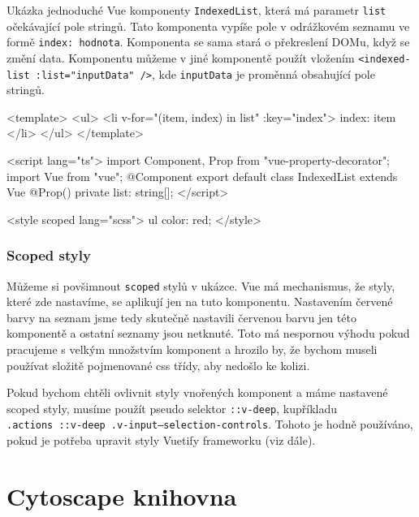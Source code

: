 \newpage

\begin{prikl}
Ukázka jednoduché Vue komponenty \texttt{IndexedList}, která má parametr \texttt{list} očekávající pole stringů. Tato komponenta vypíše pole v odrážkovém seznamu ve formě \texttt{index: hodnota}. Komponenta se sama stará o překreslení DOMu, když se změní data. Komponentu můžeme v jiné komponentě použít vložením \texttt{<indexed-list :list="inputData" />}, kde \texttt{inputData} je proměnná obsahující pole stringů.

\begin{code}
<template>
  <ul>
    <li v-for="(item, index) in list" :key="index">
      {{index}}: {{ item }}
    </li>
  </ul>
</template>

<script lang="ts">
  import {Component, Prop} from "vue-property-decorator";
  import Vue from "vue";
  @Component
  export default class IndexedList extends Vue {
    @Prop() private list: string[];
  }
</script>

<style scoped lang="scss">
  ul {
    color: red;
  }
</style>
\end{code}
\end{prikl}

\subsubsection*{Scoped styly}

Můžeme si povšimnout \texttt{scoped} stylů v ukázce. Vue má mechanismus, že styly, které zde nastavíme, se aplikují jen na tuto komponentu. Nastavením červené barvy na seznam jsme tedy skutečně nastavili červenou barvu jen této komponentě a ostatní seznamy jsou netknuté. Toto má nespornou výhodu pokud pracujeme s velkým množstvím komponent a hrozilo by, že bychom museli používat složitě pojmenované css třídy, aby nedošlo ke kolizi.

Pokud bychom chtěli ovlivnit styly vnořených komponent a máme nastavené scoped styly, musíme použít pseudo selektor \texttt{::v-deep}, kupříkladu \\  \texttt{.actions ::v-deep .v-input--selection-controls}. Tohoto je hodně používáno, pokud je potřeba upravit styly Vuetify frameworku (viz dále).

\newpage






\section{Cytoscape knihovna}

